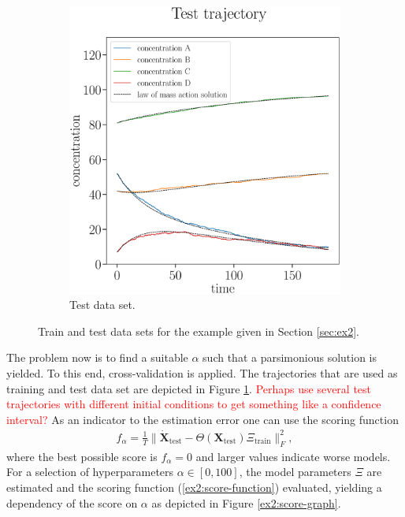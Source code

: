 \documentclass[oneside, abstracton, titlepage]{scrartcl}
\begin{document}
\begin{figure}
\begin{subfigure}[b]{.45\textwidth}
			\includegraphics[width=\textwidth]{./figures_tex/cv_concentrations_test}
			\caption{Test data set.}
		\end{subfigure}
		\caption{Train and test data sets for the example given in Section \ref{sec:ex2}.}
		\label{ex2:test-train-concentration-curves}
	\end{figure}
	
	The problem now is to find a suitable $\alpha$ such that a parsimonious solution is yielded. To this end, cross-validation is applied. The trajectories that are used as training and test data set are depicted in Figure \ref{ex2:test-train-concentration-curves}. \textcolor{red}{Perhaps use several test trajectories with different initial conditions to get something like a confidence interval?} As an indicator to the estimation error one can use the scoring function
	\begin{align}
		f_\alpha = \frac{1}{T}\|\mathbf{\dot{X}}_\text{test} - \Theta (\textbf{X}_\text{test}) \Xi_\text{train}\|_F^2,
		\label{ex2:score-function}
	\end{align}
	where the best possible score is $f_\alpha = 0$ and larger values indicate worse models.
	For a selection of hyperparameters $\alpha\in [0, 100]$, the model parameters $\Xi$ are estimated and the scoring function (\ref{ex2:score-function}) evaluated, yielding a dependency of the score on $\alpha$ as depicted in Figure \ref{ex2:score-graph}.
	
\end{document}
